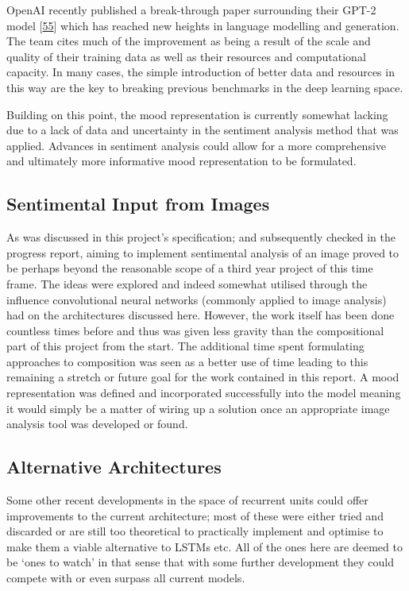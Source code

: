 \documentclass[12pt,]{article}
\begin{document}
OpenAI recently published a break-through paper surrounding their GPT-2
model {[}\protect\hyperlink{ref-radford2018language}{55}{]} which has
reached new heights in language modelling and generation. The team cites
much of the improvement as being a result of the scale and quality of
their training data as well as their resources and computational
capacity. In many cases, the simple introduction of better data and
resources in this way are the key to breaking previous benchmarks in the
deep learning space.

Building on this point, the mood representation is currently somewhat
lacking due to a lack of data and uncertainty in the sentiment analysis
method that was applied. Advances in sentiment analysis could allow for
a more comprehensive and ultimately more informative mood representation
to be formulated.

\hypertarget{sentimental-input-from-images}{%
\subsection{Sentimental Input from
Images}\label{sentimental-input-from-images}}

As was discussed in this project's specification; and subsequently
checked in the progress report, aiming to implement sentimental analysis
of an image proved to be perhaps beyond the reasonable scope of a third
year project of this time frame. The ideas were explored and indeed
somewhat utilised through the influence convolutional neural networks
(commonly applied to image analysis) had on the architectures discussed
here. However, the work itself has been done countless times before and
thus was given less gravity than the compositional part of this project
from the start. The additional time spent formulating approaches to
composition was seen as a better use of time leading to this remaining a
stretch or future goal for the work contained in this report. A mood
representation was defined and incorporated successfully into the model
meaning it would simply be a matter of wiring up a solution once an
appropriate image analysis tool was developed or found.

\hypertarget{alternative-architectures}{%
\subsection{Alternative Architectures}\label{alternative-architectures}}

Some other recent developments in the space of recurrent units could
offer improvements to the current architecture; most of these were
either tried and discarded or are still too theoretical to practically
implement and optimise to make them a viable alternative to LSTMs etc.
All of the ones here are deemed to be `ones to watch' in that sense that
with some further development they could compete with or even surpass
all current models.
\end{document}
